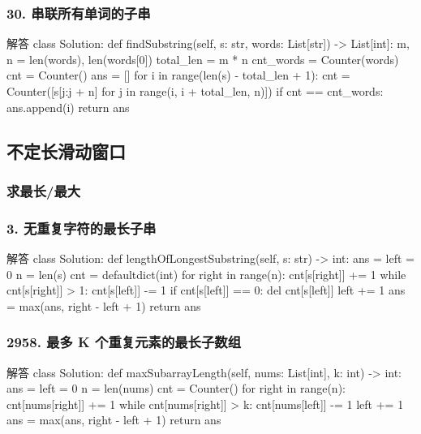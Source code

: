 \begin{frame}[fragile]          %
  \frametitle{\textsc{30. 串联所有单词的子串}}
  \begin{codeblock}[language=python]{解答}
class Solution:
  def findSubstring(self, s: str, words: List[str]) -> List[int]:
    m, n = len(words), len(words[0])
    total_len = m * n
    cnt_words = Counter(words)
    cnt = Counter()
    ans = []
    for i in range(len(s) - total_len + 1):
        cnt = Counter([s[j:j + n] for j in range(i, i + total_len, n)])
        if cnt == cnt_words:
            ans.append(i)
    return ans
  \end{codeblock}
\end{frame}

\subsection{不定长滑动窗口}

\subsubsection{求最长/最大}

\begin{frame}[fragile]          %
  \frametitle{\textsc{3. 无重复字符的最长子串}}
  \begin{codeblock}[language=python]{解答}
class Solution:
  def lengthOfLongestSubstring(self, s: str) -> int:
    ans = left = 0
    n = len(s)
    cnt = defaultdict(int)
    for right in range(n):
        cnt[s[right]] += 1
        while cnt[s[right]] > 1:
            cnt[s[left]] -= 1
            if cnt[s[left]] == 0:
                del cnt[s[left]]
            left += 1
        ans = max(ans, right - left + 1)
    return ans
  \end{codeblock}
\end{frame}


\begin{frame}[fragile]          %
  \frametitle{\textsc{2958. 最多 K 个重复元素的最长子数组}}
  \begin{codeblock}[language=python]{解答}
class Solution:
  def maxSubarrayLength(self, nums: List[int], k: int) -> int:
    ans = left = 0
    n = len(nums)
    cnt = Counter()
    for right in range(n):
        cnt[nums[right]] += 1
        while cnt[nums[right]] > k:
            cnt[nums[left]] -= 1
            left += 1
        ans = max(ans, right - left + 1)
    return ans
  \end{codeblock}
\end{frame}

